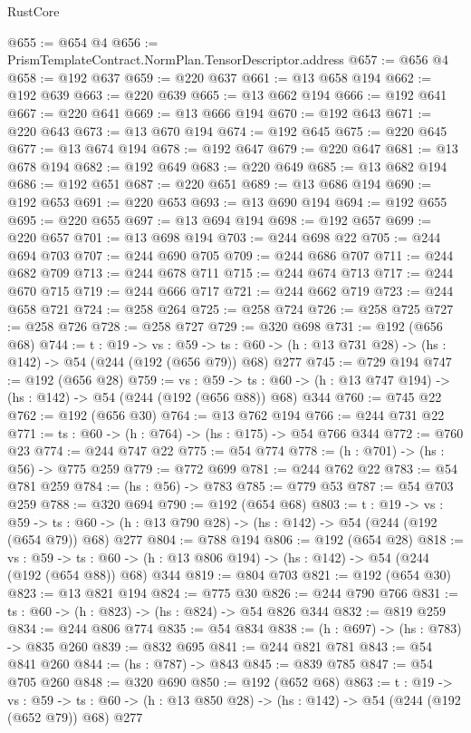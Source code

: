 \begin{lexlean}{RustCore}
\begin{coremodule}
@655 := @654 @4
@656 := PrismTemplateContract.NormPlan.TensorDescriptor.address
@657 := @656 @4
@658 := @192 @637
@659 := @220 @637
@661 := @13 @658 @194
@662 := @192 @639
@663 := @220 @639
@665 := @13 @662 @194
@666 := @192 @641
@667 := @220 @641
@669 := @13 @666 @194
@670 := @192 @643
@671 := @220 @643
@673 := @13 @670 @194
@674 := @192 @645
@675 := @220 @645
@677 := @13 @674 @194
@678 := @192 @647
@679 := @220 @647
@681 := @13 @678 @194
@682 := @192 @649
@683 := @220 @649
@685 := @13 @682 @194
@686 := @192 @651
@687 := @220 @651
@689 := @13 @686 @194
@690 := @192 @653
@691 := @220 @653
@693 := @13 @690 @194
@694 := @192 @655
@695 := @220 @655
@697 := @13 @694 @194
@698 := @192 @657
@699 := @220 @657
@701 := @13 @698 @194
@703 := @244 @698 @22
@705 := @244 @694 @703
@707 := @244 @690 @705
@709 := @244 @686 @707
@711 := @244 @682 @709
@713 := @244 @678 @711
@715 := @244 @674 @713
@717 := @244 @670 @715
@719 := @244 @666 @717
@721 := @244 @662 @719
@723 := @244 @658 @721
@724 := @258 @264
@725 := @258 @724
@726 := @258 @725
@727 := @258 @726
@728 := @258 @727
@729 := @320 @698
@731 := @192 (@656 @68)
@744 := {t : @19} ->
  {vs : @59} ->
  {ts : @60} -> (h : @13 @731 @28) -> (hs : @142) -> @54 (@244 (@192 (@656 @79)) @68) @277
@745 := @729 @194
@747 := @192 (@656 @28)
@759 := {vs : @59} ->
  {ts : @60} -> (h : @13 @747 @194) -> (hs : @142) -> @54 (@244 (@192 (@656 @88)) @68) @344
@760 := @745 @22
@762 := @192 (@656 @30)
@764 := @13 @762 @194
@766 := @244 @731 @22
@771 := {ts : @60} -> (h : @764) -> (hs : @175) -> @54 @766 @344
@772 := @760 @23
@774 := @244 @747 @22
@775 := @54 @774
@778 := (h : @701) -> (hs : @56) -> @775 @259
@779 := @772 @699
@781 := @244 @762 @22
@783 := @54 @781 @259
@784 := (hs : @56) -> @783
@785 := @779 @53
@787 := @54 @703 @259
@788 := @320 @694
@790 := @192 (@654 @68)
@803 := {t : @19} ->
  {vs : @59} ->
  {ts : @60} -> (h : @13 @790 @28) -> (hs : @142) -> @54 (@244 (@192 (@654 @79)) @68) @277
@804 := @788 @194
@806 := @192 (@654 @28)
@818 := {vs : @59} ->
  {ts : @60} -> (h : @13 @806 @194) -> (hs : @142) -> @54 (@244 (@192 (@654 @88)) @68) @344
@819 := @804 @703
@821 := @192 (@654 @30)
@823 := @13 @821 @194
@824 := @775 @30
@826 := @244 @790 @766
@831 := {ts : @60} -> (h : @823) -> (hs : @824) -> @54 @826 @344
@832 := @819 @259
@834 := @244 @806 @774
@835 := @54 @834
@838 := (h : @697) -> (hs : @783) -> @835 @260
@839 := @832 @695
@841 := @244 @821 @781
@843 := @54 @841 @260
@844 := (hs : @787) -> @843
@845 := @839 @785
@847 := @54 @705 @260
@848 := @320 @690
@850 := @192 (@652 @68)
@863 := {t : @19} ->
  {vs : @59} ->
  {ts : @60} -> (h : @13 @850 @28) -> (hs : @142) -> @54 (@244 (@192 (@652 @79)) @68) @277

\end{coremodule}
\end{lexlean}
